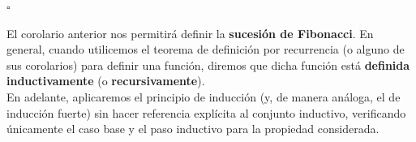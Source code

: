 \documentclass[10 pt]{article}
\begin{document}
\begin{flushright}
    $\square$
\end{flushright}

\Large{El corolario anterior nos permitirá definir la \textbf{sucesión de Fibonacci}. En general, cuando utilicemos el teorema de definición por recurrencia (o alguno de sus corolarios) para definir una función, diremos que dicha función está \textbf{definida inductivamente} (o \textbf{recursivamente}).} \\

\Large{ En adelante, aplicaremos el principio de inducción (y, de manera análoga, el de inducción fuerte) sin hacer referencia explícita al conjunto inductivo, verificando únicamente el caso base y el paso inductivo para la propiedad considerada.} \\
\end{document}
